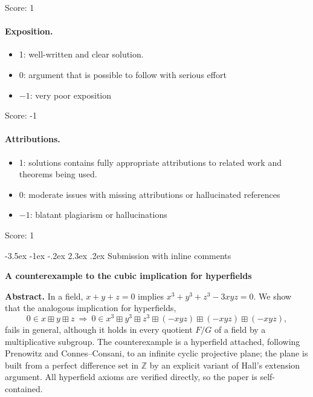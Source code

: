 \documentclass[11pt]{article}
\makeatletter
\renewcommand\section{\@startsection{section}{1}{\z@}
  {-3.5ex \@plus -1ex \@minus -.2ex}
  {2.3ex \@plus.2ex}
  {\normalfont\bfseries}}
\theoremstyle{plain}
\theoremstyle{definition}
\newcommand{\Z}{\mathbb{Z}}
\newcommand{\bp}{\boxplus}
\makeatother
\begin{document}
\noindent Score: 1

\paragraph{Exposition.}
\begin{itemize}
	\item  1: well-written and clear solution.
	\item  0: argument that is possible to follow with serious effort
	\item  $-1$: very poor exposition
\end{itemize}

\noindent Score: -1

\paragraph{Attributions.}
\begin{itemize}
	\item  1: solutions contains fully appropriate attributions
		to related work and theorems being used.
	\item  0: moderate issues with missing attributions or hallucinated references
	\item  $-1$: blatant plagiarism or hallucinations
\end{itemize}

\noindent Score: 1

\newpage
\section{Submission with inline comments}


\begin{center}
{\textbf{A counterexample to the cubic implication for hyperfields}}
\end{center}

\medskip
\noindent\textbf{Abstract.}
In a field, $x+y+z=0$ implies $x^3+y^3+z^3-3xyz=0$.  We show that the
analogous implication for hyperfields,
\[
 0\in x\bp y\bp z
 \ \Longrightarrow\
 0\in x^3\bp y^3\bp z^3\bp(-xyz)\bp(-xyz)\bp(-xyz),
\]
fails in general, although it holds in every quotient $F/G$ of a field
by a multiplicative subgroup.  The counterexample is a hyperfield
attached, following Prenowitz and Connes--Consani, to an infinite
cyclic projective plane; the plane is built from a perfect difference
set in $\Z$ by an explicit variant of Hall's extension argument.  All
hyperfield axioms are verified directly, so the paper is
self-contained.
\end{document}
